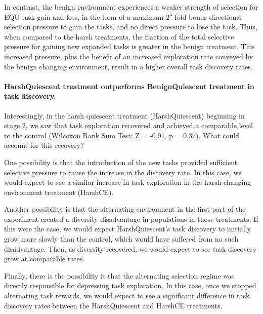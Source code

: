 \documentclass[PhD]{msu-thesis}
\begin{document}

In contrast, the benign environment experiences a weaker strength of selection for EQU task gain and loss, in the form of a maximum $2^5$-fold bonus directional selection pressure to gain the tasks, and no direct pressure to lose the task. Thus, when compared to the harsh treatments, the fraction of the total selective pressure for gaining new expanded tasks is greater in the benign treatment. This increased pressure, plus the benefit of an increased exploration rate conveyed by the benign changing environment, result in a higher overall task discovery rates.

\paragraph{HarshQuiescent treatment outperforms BenignQuiescent treatment in task discovery.}
Interestingly, in the harsh quiescent treatment (HarshQuiescent) beginning in stage 2, we saw that task exploration recovered and achieved a comparable level to the control (Wilcoxon Rank Sum Test: Z = -0.91, p = 0.37). What could account for this recovery? 

One possibility is that the introduction of the new tasks provided sufficient selective pressure to cause the increase in the discovery rate. In this case, we would expect to see a similar increase in task exploration in the harsh changing environment treatment (HarshCE). 

Another possibility is that the alternating environment in the first part of the experiment created a diversity disadvantage in populations in those treatments. If this were the case, we would expect HarshQuiescent's task discovery to initially grow more slowly than the control, which would have suffered from no such disadvantage. Then, as diversity recovered, we would expect to see task discovery grow at comparable rates.

Finally, there is the possibility is that the alternating selection regime was directly responsible for depressing task exploration. In this case, once we stopped alternating task rewards, we would expect to see a significant difference in task discovery rates between the HarshQuiescent and HarshCE treatments. 
\end{document}
